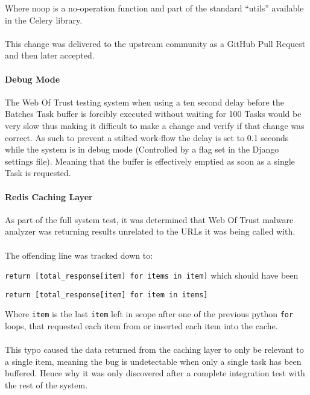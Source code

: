 Where noop is a no-operation function and part of the standard ``utils'' available in the Celery library.

\paragraph{}
This change was delivered to the upstream community as a GitHub Pull Request and then later accepted\cite{celery-batches-fix}.

\paragraph{Debug Mode}
The Web Of Trust testing system when using a ten second delay before the Batches Task buffer is forcibly executed without waiting for 100 Tasks would be very slow thus making it difficult to make a change and verify if that change was correct. As such to prevent a stilted work-flow the delay is set to 0.1 seconds while the system is in debug mode (Controlled by a flag set in the Django settings file).  Meaning that the buffer is effectively emptied as soon as a single Task is requested.
\paragraph{Redis Caching Layer}
As part of the full system test, it was determined that Web Of Trust malware analyzer was returning results unrelated to the URLs it was being called with.

\paragraph{}
The offending line was tracked down to:

\verb`return [total_response[item] for items in item]` which should have been

\verb`return [total_response[item] for item in items]`

Where \verb`item` is the last \verb`item` left in scope after one of the previous python \verb`for` loops, that requested each item from or inserted each item into the cache.

\paragraph{}
This typo caused the data returned from the caching layer to only be relevant to a single item, meaning the bug is undetectable when only a single task has been buffered. Hence why it was only discovered after a complete integration test with the rest of the system.

